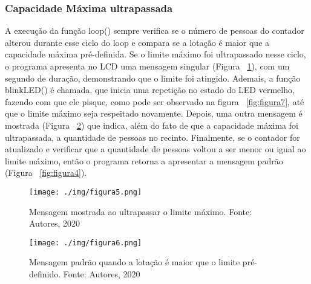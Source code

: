 \documentclass[10pt,twocolumn,letterpaper]{article}
\begin{document}
\subsubsection{Capacidade Máxima ultrapassada}

A execução da função loop() sempre verifica se o número de pessoas do contador alterou durante esse ciclo do loop e compara se a lotação é maior que a capacidade máxima pré-definida. Se o limite máximo foi ultrapassado nesse ciclo, o programa apresenta no LCD uma mensagem singular (Figura ~\ref{fig:figura5}), com um segundo de duração, demonstrando que o limite foi atingido. Ademais, a função blinkLED() é chamada, que inicia uma repetição no estado do LED vermelho, fazendo com que ele pisque, como pode ser observado na figura  ~\ref{fig:figura7}, até que o limite máximo seja respeitado novamente. Depois, uma outra mensagem é mostrada (Figura ~\ref{fig:figura6}) que indica, além do fato de que a capacidade máxima foi ultrapassada, a quantidade de pessoas no recinto. Finalmente, se o contador for atualizado e verificar que a quantidade de pessoas voltou a ser menor ou igual ao limite máximo, então o programa retorna a apresentar a mensagem padrão (Figura ~\ref{fig:figura4}).

{
\begin{figure}[!h]
\begin{center}
   \texttt{[image: ./img/figura5.png]}
\end{center}
   \caption{Mensagem mostrada ao ultrapassar o limite máximo. \newline \centering Fonte: Autores, 2020}
\label{fig:figura5}
\end{figure}
}

{
\begin{figure}[!h]
\begin{center}
   \texttt{[image: ./img/figura6.png]}
\end{center}
   \caption{ Mensagem padrão quando a lotação é maior  que o limite pré-definido. \newline \centering Fonte: Autores, 2020}
\label{fig:figura6}
\end{figure}
}
\end{document}

